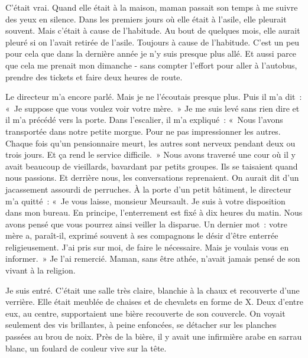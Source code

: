 \documentclass[french,twoside]{book} %
\begin{document}
C'était vrai. Quand elle était à la maison, maman passait son temps à me suivre des yeux en silence. Dans les premiers jours où elle était à l’asile, elle pleurait souvent. Mais c’était à cause de l’habitude. Au bout de quelques mois, elle aurait pleuré si on l’avait retirée de l’asile. Toujours à cause de l’habitude. C'est un peu pour cela que dans la dernière année je n’y suis presque plus allé. Et aussi parce que cela me prenait mon dimanche - sans compter l’effort pour aller à l’autobus, prendre des tickets et faire deux heures de route.\par
Le directeur m’a encore parlé. Mais je ne l’écoutais presque plus. Puis il m’a dit : « Je suppose que vous voulez voir votre mère. » Je me suis levé sans rien dire et il m’a précédé vers la porte. Dans l’escalier, il m’a expliqué : « Nous l’avons transportée dans notre petite morgue. Pour ne pas impressionner les autres. Chaque fois qu’un pensionnaire meurt, les autres sont nerveux pendant deux ou trois jours. Et ça rend le service difficile. » Nous avons traversé une cour où il y avait beaucoup de vieillards, bavardant par petits groupes. Ils se taisaient quand nous passions. Et derrière nous, les conversations reprenaient. On aurait dit d’un jacassement assourdi de perruches. À la porte d’un petit bâtiment, le directeur m’a quitté : « Je vous laisse, monsieur Meursault. Je suis à votre disposition dans mon bureau. En principe, l’enterrement est fixé à dix heures du matin. Nous avons pensé que vous pourrez ainsi veiller la disparue. Un dernier mot : votre mère a, paraît-il, exprimé souvent à ses compagnons le désir d’être enterrée religieusement. J'ai pris sur moi, de faire le nécessaire. Mais je voulais vous en informer. » Je l’ai remercié. Maman, sans être athée, n’avait jamais pensé de son vivant à la religion.\par
Je suis entré. C'était une salle très claire, blanchie à la chaux et recouverte d’une verrière. Elle était meublée de chaises et de chevalets en forme de X. Deux d’entre eux, au centre, supportaient une bière recouverte de son couvercle. On voyait seulement des vis brillantes, à peine enfoncées, se détacher sur les planches passées au brou de noix. Près de la bière, il y avait une infirmière arabe en sarrau blanc, un foulard de couleur vive sur la tête.\par
\end{document}
